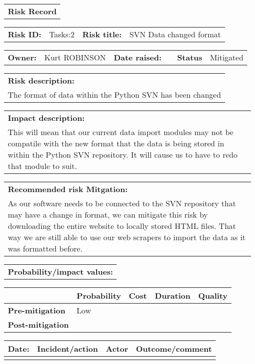 \begin{table}
	\begin{tabularx}{\textwidth}{| X |}
		\hline
		\textbf{Risk Record} \\
	\end{tabularx}
	\begin{tabularx}{\textwidth}{| l | X | l | X |}
		\hline
		\textbf{Risk ID:} & Tasks:2 & \textbf{Risk title:} & SVN Data changed format \\
	\end{tabularx}
	\begin{tabularx}{\textwidth}{| l | X | l | X | l | X |}
		\hline
		\textbf{Owner:} & Kurt ROBINSON & \textbf{Date raised:} &  & \textbf{Status} & Mitigated \\
	\end{tabularx}
	\begin{tabularx}{\textwidth}{| X |}
		\hline
		\textbf{Risk description:} \\ The format of data within the Python SVN has been changed  \\
	\end{tabularx}
	\begin{tabularx}{\textwidth}{| X |}
		\hline
		\textbf{Impact description:} \\ This will mean that our current data import modules may not be compatile with the new format that the data is being stored in within the Python SVN repository. It will cause us to have to redo that module to suit. \\
	\end{tabularx}
	\begin{tabularx}{\textwidth}{| X |}
		\hline
		\textbf{Recommended risk Mitgation:} \\ As our software needs to be connected to the SVN repository that may have a change in format, we can mitigate this risk by downloading the entire website to locally stored HTML files. That way we are still able to use our web scrapers to import the data as it was formatted before. \\
	\end{tabularx}
	\begin{tabularx}{\textwidth}{| X |}
		\hline
		\textbf{Probability/impact values:} \\
	\end{tabularx}
	\begin{tabularx}{\textwidth}{| l | l | X | X | X |}
		\hline
		 &  \textbf{Probability} & \textbf{Cost} & \textbf{Duration} & \textbf{Quality} \\ \hline
		\textbf{Pre-mitigation} & Low & & & \\ \hline
		\textbf{Post-mitigation} & & & & \\ \hline \hline
	\end{tabularx}
	\begin{tabularx}{\textwidth}{| l | X | l | X |}
		\hline
		\textbf{Date:} & \textbf{Incident/action} & \textbf{Actor} & \textbf{Outcome/comment} \\ \hline
		 &  &  &  \\ \hline
	\end{tabularx}
\end{table}

